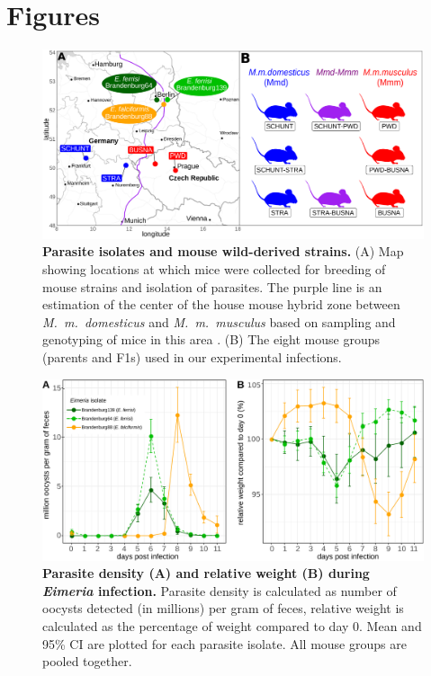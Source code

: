 \documentclass[12pt]{article}
\begin{document}
\section*{Figures}

\begin{figure}[H]
    \centering
    \includegraphics[width=\linewidth,height=\textheight,keepaspectratio]{images/Fig1_final.pdf}
    \caption{\textbf{Parasite isolates and mouse wild-derived strains.} (A) Map showing locations at which mice were collected for breeding of mouse strains and isolation of parasites. The purple line is an estimation of the center of the house mouse hybrid zone between \textit{M.~m.~domesticus} and \textit{M.~m.~musculus} based on sampling and genotyping of mice in this area \citep{Balard2020, dureje_mouse_2012, macholan_widespread_2019}. (B) The eight mouse groups (parents and F1s) used in our experimental infections.}
\end{figure}

\begin{figure}[H]
    \centering
    \includegraphics[width=\linewidth,height=\textheight,keepaspectratio]{images/Fig2_final.pdf}
    \caption{\textbf{Parasite density (A) and relative weight (B) during \textit{Eimeria} infection.} Parasite density is calculated as number of oocysts detected (in millions) per gram of feces, relative weight is calculated as the percentage of weight compared to day 0. Mean and 95\% CI are plotted for each parasite isolate. All mouse groups are pooled together.}
\end{figure}
\end{document}

